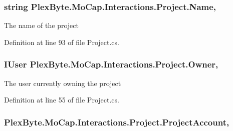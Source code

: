 \subsubsection[{\texorpdfstring{Name}{Name}}]{\setlength{\rightskip}{0pt plus 5cm}string Plex\+Byte.\+Mo\+Cap.\+Interactions.\+Project.\+Name\hspace{0.3cm}{\ttfamily [get]}, {\ttfamily [set]}}\hypertarget{class_plex_byte_1_1_mo_cap_1_1_interactions_1_1_project_aa6a59b416e07515e6d8799f410157488}{}\label{class_plex_byte_1_1_mo_cap_1_1_interactions_1_1_project_aa6a59b416e07515e6d8799f410157488}


The name of the project 



Definition at line 93 of file Project.\+cs.

\subsubsection[{\texorpdfstring{Owner}{Owner}}]{\setlength{\rightskip}{0pt plus 5cm}I\+User Plex\+Byte.\+Mo\+Cap.\+Interactions.\+Project.\+Owner\hspace{0.3cm}{\ttfamily [get]}, {\ttfamily [set]}}\hypertarget{class_plex_byte_1_1_mo_cap_1_1_interactions_1_1_project_adf1484b6a6103c1c2104f6dfbba9eace}{}\label{class_plex_byte_1_1_mo_cap_1_1_interactions_1_1_project_adf1484b6a6103c1c2104f6dfbba9eace}


The user currently owning the project 



Definition at line 55 of file Project.\+cs.

\subsubsection[{\texorpdfstring{Project\+Account}{ProjectAccount}}]{ Plex\+Byte.\+Mo\+Cap.\+Interactions.\+Project.\+Project\+Account\hspace{0.3cm}{\ttfamily [get]}, {\ttfamily [set]}}\hypertarget{class_plex_byte_1_1_mo_cap_1_1_interactions_1_1_project_a453929da12473119b7d1d4bd21e986c4}{}\label{class_plex_byte_1_1_mo_cap_1_1_interactions_1_1_project_a453929da12473119b7d1d4bd21e986c4}


